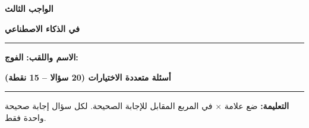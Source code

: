 \documentclass[a4paper]{article}
\newif\ifcorrection
\begin{document}
\begin{center}

{\Large\khatt\textbf{الواجب الثالث}\ifcorrection\ \textbf{-- التصحيح النموذجي}\fi}

\vspace{0.2cm}

{\Large\khatt\textbf{في الذكاء الاصطناعي}}

\end{center}

\rule{\textwidth}{1pt}

\ifcorrection\else
\textbf{الاسم واللقب:} \dotfill \quad \textbf{الفوج:} \makebox[3cm]{\dotfill}

\vspace{0.3cm}
\fi

\begin{center}

{\khatt\textbf{أسئلة متعددة الاختيارات (20 سؤالا -- 15 نقطة)}}

\end{center}

\rule{\textwidth}{1pt}

\textbf{التعليمة:} ضع علامة \textbf{$\times$} في المربع المقابل للإجابة الصحيحة. لكل سؤال إجابة صحيحة واحدة فقط.

\vspace{0.3cm}
\end{document}
